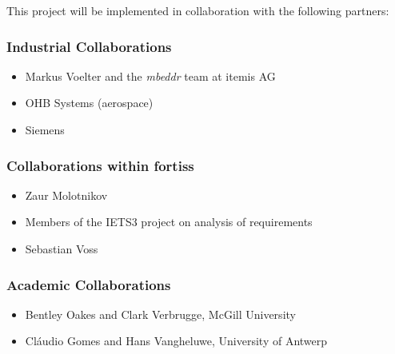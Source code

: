 This project will be implemented in collaboration with the following partners:

\subsubsection{Industrial Collaborations}
\begin{itemize}
  \item Markus Voelter and the \emph{mbeddr} team at itemis AG
  \item OHB Systems (aerospace)
  \item Siemens
\end{itemize}

\subsubsection{Collaborations within fortiss}
\begin{itemize}
  \item Zaur Molotnikov
  \item Members of the IETS3 project on analysis of requirements
  \item Sebastian Voss
\end{itemize}

\subsubsection{Academic Collaborations}
\begin{itemize}
  \item Bentley Oakes and Clark Verbrugge, McGill University
  \item Cl\'audio Gomes and Hans Vangheluwe, University of Antwerp
\end{itemize}